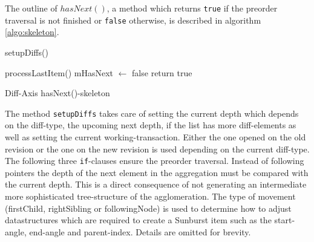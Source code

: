 The outline of $hasNext()$, a method which returns \texttt{true} if the preorder traversal is not finished or \texttt{false} otherwise, is described in algorithm \ref{algo:skeleton}.

\begin{algorithm}[tb]
{}
\BlankLine
{}

setupDiffs()\;

processLastItem()\;
mHasNext $\leftarrow$ false\;
return true\;
\caption{Diff-Axis hasNext()-skeleton}\label{algo:skeleton}
\end{algorithm}

The method \texttt{setupDiffs} takes care of setting the current depth which depends on the diff-type, the upcoming next depth, if the list has more diff-elements as well as setting the current working-transaction. Either the one opened on the old revision or the one on the new revision is used depending on the current diff-type. The following three \texttt{if}-clauses ensure the preorder traversal. Instead of following pointers the depth of the next element in the aggregation must be compared with the current depth. This is a direct consequence of not generating an intermediate more sophisticated tree-structure of the agglomeration. The type of movement (firstChild, rightSibling or followingNode) is used to determine how to adjust datastructures which are required to create a Sunburst item such as the start-angle, end-angle and parent-index. Details are omitted for brevity. 

